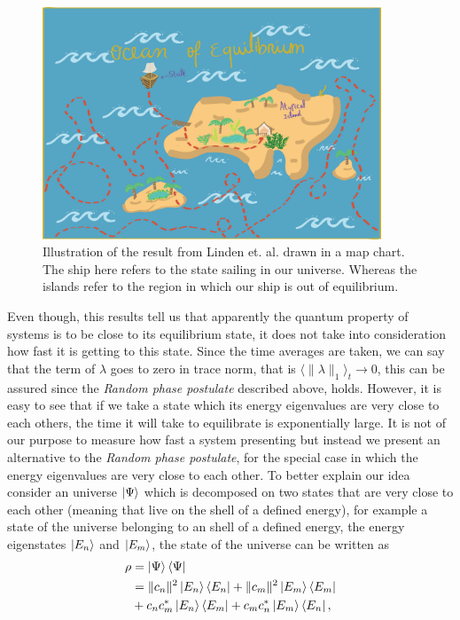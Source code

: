 \begin{figure}[h!]
\centering
\includegraphics[width=0.9\textwidth]{Figures/ocean-of-equilibrium.png}
\caption{Illustration of the result from Linden et. al. drawn in a map chart. The ship here refers to the state sailing in our universe. Whereas the islands refer to the region in which our ship is out of equilibrium.}
\label{Island_of_equilibrium}
\end{figure}
Even though, this results tell us that apparently the quantum property of systems is to be close to its equilibrium state, it does not take into consideration how fast it is getting to this state. Since the time averages are taken, we can say that the term of $\lambda$ goes to zero in trace norm, that is $\langle\| \lambda\|_1\rangle_t \to 0$, this can be assured since the \textit{Random phase postulate} described above, holds. However, it is easy to see that if we take a state which  its energy eigenvalues are very close to each others, the time it will take to equilibrate is exponentially large. It is not of our purpose to measure how fast a system presenting but instead we present an alternative to the \textit{Random phase postulate}, for the special case in which the energy eigenvalues are very close to each other.\newline
To better explain our idea consider an universe $\mathinner{|{\Psi}\rangle}$ which is decomposed on two states that are very close to each other (meaning that live on the shell of a defined energy), for example a state of the universe belonging to an shell of a defined energy, the energy eigenstates $\mathinner{|{E_n}\rangle}$ and $\mathinner{|{E_m}\rangle}$, the state of the universe can be written as
\begin{equation}
\begin{aligned}
\rho &= \mathinner{|{\Psi}\rangle}\mathinner{\langle{\Psi}|}\\
&= \|c_n\|^2 \mathinner{|{E_n}\rangle}\mathinner{\langle{E_n}|} +  \|c_m\|^2 \mathinner{|{E_m}\rangle}\mathinner{\langle{E_m}|} \\
& + c_n c^{*}_m  \mathinner{|{E_n}\rangle}\mathinner{\langle{E_m}|}+ c_m c^{*}_n \mathinner{|{E_m}\rangle}\mathinner{\langle{E_n}|},
\end{aligned}
\label{CH1:State_as_function_of_time}
\end{equation}
